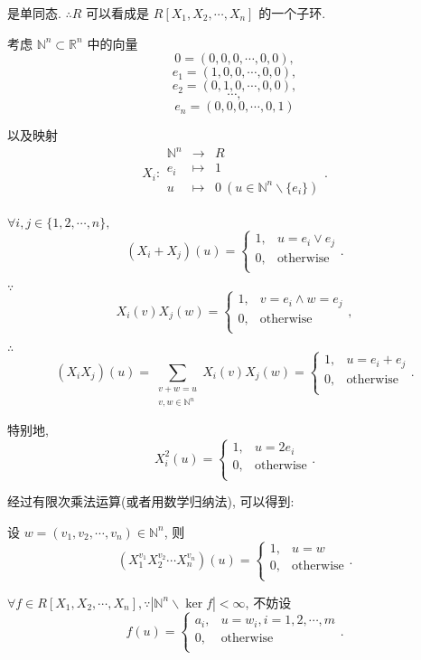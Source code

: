 \documentclass[UTF8]{ctexart}
\begin{document}
是单同态. $\therefore R$ 可以看成是 $R[X_1,X_2,\cdots,X_n]$ 的一个子环.

考虑 $\mathbb{N}^n\subset\mathbb{R}^n$ 中的向量
\[0=(0,0,0,\cdots,0,0),\]
\[e_1=(1,0,0,\cdots,0,0),\]
\[e_2=(0,1,0,\cdots,0,0),\]
\[\cdots,\]
\[e_n=(0,0,0,\cdots,0,1)\]

以及映射
\[X_i:\begin{array}{rcl}
    \mathbb{N}^n & \to & R \\
    e_i & \mapsto & 1 \\
    u & \mapsto & 0\ (u\in\mathbb{N}^n\backslash\{e_i\}) \\
\end{array}.\]

$\forall i,j\in\{1,2,\cdots,n\},$
\[(X_i+X_j)(u)=\begin{cases}
    1, & u=e_i\vee e_j \\
    0, & \text{otherwise} \\
\end{cases}.\]

$\because$
\[X_i(v)X_j(w)=\begin{cases}
    1, & v=e_i\land w=e_j \\
    0, & \text{otherwise} \\
\end{cases},\]

$\therefore$
\[(X_iX_j)(u)=\sum\limits_{\substack{v+w=u\\v,w\in\mathbb{N}^n}}X_i(v)X_j(w)
=\begin{cases}
    1, & u=e_i+e_j \\
    0, & \text{otherwise} \\
\end{cases}.\]

特别地,
\[X_i^2(u)=\begin{cases}
    1, & u=2e_i \\
    0, & \text{otherwise} \\
\end{cases}.\]

经过有限次乘法运算(或者用数学归纳法), 可以得到:

设 $w=(v_1,v_2,\cdots,v_n)\in\mathbb{N}^n$, 则
\[(X_1^{v_1}X_2^{v_2}\cdots X_n^{v_n})(u)=\begin{cases}
    1, & u=w \\
    0, & \text{otherwise} \\
\end{cases}.\]

$\forall f\in R[X_1,X_2,\cdots,X_n],\because|\mathbb{N}^n\backslash\ker f|<\infty$, 不妨设
\[f(u)=\begin{cases}
    a_i, & u=w_i,i=1,2,\cdots,m \\
    0, & \text{otherwise} \\
\end{cases}.\]
\end{document}
